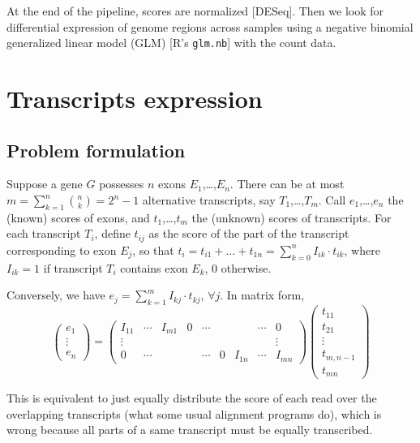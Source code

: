 \documentclass[a4paper,11pt]{article}
\begin{document}
At the end of the pipeline, scores are normalized [DESeq]. Then we look for differential expression of genome regions across samples using a negative binomial generalized linear model (GLM) [R's \texttt{glm.nb}] with the count data.

\section{Transcripts expression}

\subsection{Problem formulation}

Suppose a gene $G$ possesses $n$ exons $E_1$,\ldots,$E_n$. There can be at most $m = \sum_{k=1}^n {n \choose k} = 2^{n}-1$ alternative transcripts, say $T_1$,\ldots,$T_{m}$. Call $e_1$,\ldots,$e_n$ the (known) scores of exons, and $t_1$,\ldots,$t_{m}$ the (unknown) scores of transcripts. For each transcript $T_i$, define $t_{ij}$ as the score of the part of the transcript corresponding to exon $E_j$, so that $t_i = t_{i1} + \ldots + t_{1n} = \sum_{k=0}^n I_{ik} \cdot t_{ik}$, where $I_{ik} = 1$ if transcript $T_i$ contains exon $E_k$, 0 otherwise.

Conversely, we have $e_j = \sum_{k=1}^{m} I_{kj} \cdot t_{kj}$, $\forall j$. In matrix form,
$$
\begin{pmatrix}
e_1 \\ \vdots \\ e_n
\end{pmatrix}
=
\begin{pmatrix}
I_{11} & \cdots & I_{m1} & 0 & \cdots &   &      & \cdots & 0 \\
\vdots & &&&&&&& \vdots \\
0      & \cdots &        &   & \cdots & 0 &I_{1n} & \cdots & I_{mn}
\end{pmatrix}
\begin{pmatrix}
t_{11} \\ t_{21} \\ \vdots \\ t_{m,n-1} \\t_{mn}
\end{pmatrix}
$$

This is equivalent to just equally distribute the score of each read over the overlapping transcripts (what some usual alignment programs do), which is wrong because all parts of a same transcript must be equally transcribed. 
\end{document}
